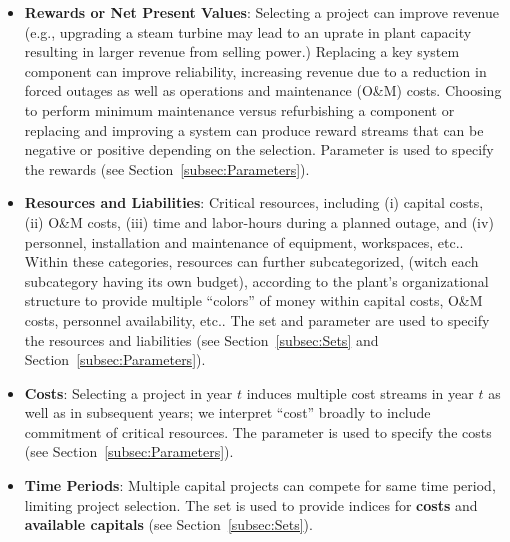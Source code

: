 \begin{itemize}
  \item \textbf{Rewards or Net Present Values}: Selecting a project can improve revenue (e.g.,
  upgrading a steam turbine may lead to an uprate in plant capacity resulting in larger
  revenue from selling power.) Replacing a key system component can improve reliability,
  increasing revenue due to a reduction in forced outages as well as operations and
  maintenance (O\&M) costs. Choosing to perform minimum maintenance versus refurbishing
  a component or replacing and improving a system can produce reward streams that
  can be negative or positive depending on the selection. Parameter
   is used to specify the rewards (see Section~\ref{subsec:Parameters}).

  \item \textbf{Resources and Liabilities}: Critical resources, including (i) capital costs,
  (ii) O\&M costs, (iii) time and labor-hours during a planned outage, and (iv) personnel,
  installation and maintenance of equipment, workspaces, etc.. Within these categories, resources
  can further subcategorized, (witch each subcategory having its own budget), according to the plant’s organizational
  structure to provide multiple “colors” of money within capital costs, O\&M costs,
  personnel availability, etc.. The set  and parameter
   are used to specify the resources and
  liabilities (see Section~\ref{subsec:Sets} and Section~\ref{subsec:Parameters}).

  \item \textbf{Costs}: Selecting a project in year $t$ induces multiple
  cost streams in year $t$ as well as in subsequent years; we interpret “cost” broadly to
  include commitment of critical resources. The parameter  is used to specify
  the costs (see Section~\ref{subsec:Parameters}).

  \item \textbf{Time Periods}: Multiple capital projects can compete for same time period,
  limiting project selection. The set  is used to provide indices for
  \textbf{costs} and \textbf{available capitals} (see Section~\ref{subsec:Sets}).


\end{itemize}
